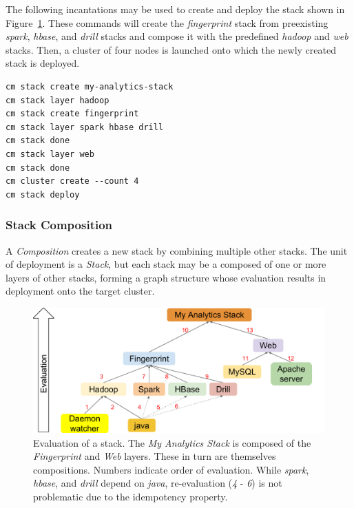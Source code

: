 The following incantations may be used to create and deploy the stack
shown in Figure~\ref{F:stack-graph}. These commands will create the
{\it fingerprint} stack from preexisting {\it spark}, {\it hbase},
and {\it drill} stacks and compose it with the predefined
{\it hadoop} and {\it web} stacks. Then, a cluster of four nodes is
launched onto which the newly created stack is deployed.

\begin{Verbatim}[fontfamily=helvetica]
cm stack create my-analytics-stack
cm stack layer hadoop
cm stack create fingerprint
cm stack layer spark hbase drill
cm stack done
cm stack layer web
cm stack done
cm cluster create --count 4
cm stack deploy
\end{Verbatim}


\subsubsection{Stack Composition} \label{S:composition}

A {\it Composition} creates a new stack by combining multiple other
stacks.  The unit of deployment is a {\it Stack}, but each stack may
be a composed of one or more layers of other stacks, forming a graph
structure whose evaluation results in deployment onto the target
cluster.

\begin{figure}
\centering
\includegraphics[width=1\columnwidth]{images/cloudmesh-stack-graph.pdf}
\caption{Evaluation of a stack.
  The {\it My Analytics Stack} is composed of the {\it Fingerprint} and {\it Web} layers.
  These in turn are themselves compositions.
  Numbers indicate order of evaluation.
  While {\it spark}, {\it hbase}, and {\it drill} depend on {\it java}, 
  re-evaluation (\textit{4} - \textit{6}) is not problematic due to the idempotency property.
  \label{F:stack-graph}}
\end{figure}


